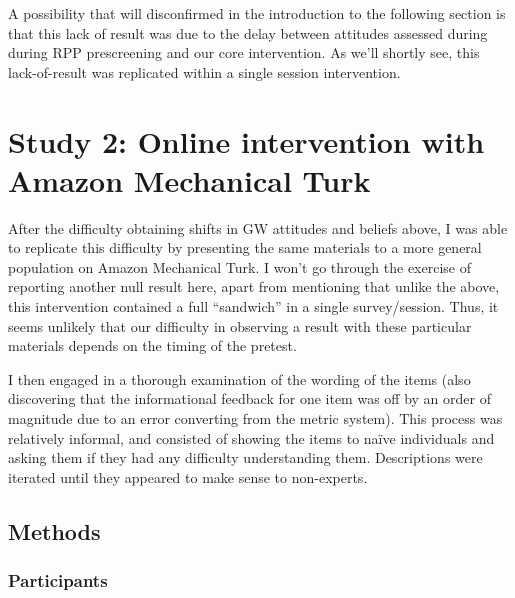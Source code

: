 A possibility that will disconfirmed in the introduction to the following
section is that this lack of result was due to the delay between attitudes
assessed during during RPP prescreening and our core intervention. As we'll
shortly see, this lack-of-result was replicated within a single session
intervention.

\section{Study 2: Online intervention with Amazon Mechanical Turk}
\label{sec:pro-mturk}

After the difficulty obtaining shifts in GW attitudes and beliefs above, I was
able to replicate this difficulty by presenting the same materials to a more
general population on Amazon Mechanical Turk. I won't go through the
exercise of reporting another null result here, apart from mentioning that
unlike the above, this intervention contained a full “sandwich” in a single
survey/session. Thus, it seems unlikely that our difficulty in observing a
result with these particular materials depends on the timing of the pretest.

I then engaged in a thorough examination of the wording of the items (also
discovering that the informational feedback for one item was off by an order of
magnitude due to an error converting from the metric system).  This process was
relatively informal, and consisted of showing the items to naïve individuals and
asking them if they had any difficulty understanding them.  Descriptions were
iterated until they appeared to make sense to non-experts.

\subsection{Methods}
\label{sec:CCO-ndi-methods}

\subsubsection{Participants}

